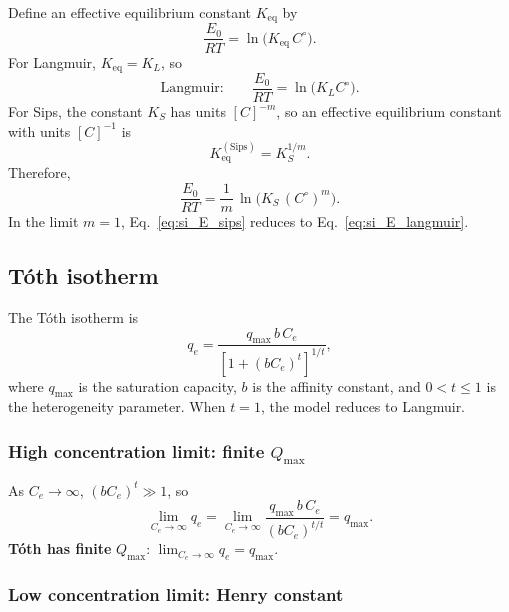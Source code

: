 \documentclass[journal=jacsat,manuscript=article]{achemso}
\begin{document}
Define an effective equilibrium constant \(K_{\mathrm{eq}}\) by
\begin{equation}
	\frac{E_0}{RT} = \ln\!\big(K_{\mathrm{eq}}\,C^\circ\big).
	\label{eq:si_E_def}
\end{equation}
For Langmuir, \(K_{\mathrm{eq}} = K_L\), so
\begin{equation}
	\text{Langmuir:}\qquad
	\frac{E_0}{RT} = \ln\!\big(K_L C^\circ\big).
	\label{eq:si_E_langmuir}
\end{equation}
For Sips, the constant \(K_S\) has units \([C]^{-m}\), so an effective
equilibrium constant with units \([C]^{-1}\) is
\begin{equation}
	K_{\mathrm{eq}}^{\mathrm{(Sips)}} = K_S^{1/m}.
\end{equation}
Therefore,
\begin{equation}
	\frac{E_0}{RT}
	= \frac{1}{m}\,\ln\!\big(K_S\,(C^\circ)^{m}\big).
	\label{eq:si_E_sips}
\end{equation}
In the limit \(m = 1\), Eq.~\eqref{eq:si_E_sips} reduces to
Eq.~\eqref{eq:si_E_langmuir}.

\subsection{T\'{o}th isotherm}
\label{sec:si_toth}

The T\'{o}th isotherm is
\begin{equation}
	q_e = \frac{q_{\max}\, b\, C_e}{\left[1 + (b C_e)^t\right]^{1/t}},
	\label{eq:si_toth}
\end{equation}
where $q_{\max}$ is the saturation capacity, $b$ is the affinity
constant, and $0 < t \leq 1$ is the heterogeneity parameter.
When $t = 1$, the model reduces to Langmuir.

\subsubsection{High concentration limit: finite $Q_{\max}$}

As $C_e \to \infty$, $(bC_e)^t \gg 1$, so
\begin{equation}
	\lim_{C_e \to \infty} q_e
	= \lim_{C_e \to \infty}
	\frac{q_{\max}\, b\, C_e}{(b C_e)^{t/t}}
	= q_{\max}.
\end{equation}
\textbf{T\'{o}th has finite }$Q_{\max}$:\quad
$\displaystyle \lim_{C_e \to \infty} q_e = q_{\max}$.%

\subsubsection{Low concentration limit: Henry constant}
\end{document}
